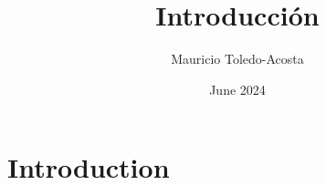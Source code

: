 \documentclass{article}
\title{Introducción}
\author{Mauricio Toledo-Acosta}
\date{June 2024}
\begin{document}
\maketitle

\section{Introduction}
\end{document}

